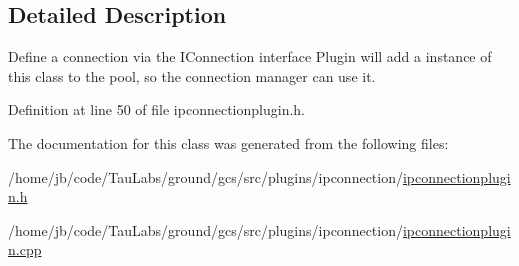 \subsection{\-Detailed \-Description}
\-Define a connection via the \-I\-Connection interface \-Plugin will add a instance of this class to the pool, so the connection manager can use it. 

\-Definition at line 50 of file ipconnectionplugin.\-h.



\-The documentation for this class was generated from the following files\-:\begin{DoxyCompactItemize}
\item 
/home/jb/code/\-Tau\-Labs/ground/gcs/src/plugins/ipconnection/\hyperlink{ipconnectionplugin_8h}{ipconnectionplugin.\-h}\item 
/home/jb/code/\-Tau\-Labs/ground/gcs/src/plugins/ipconnection/\hyperlink{ipconnectionplugin_8cpp}{ipconnectionplugin.\-cpp}\end{DoxyCompactItemize}
